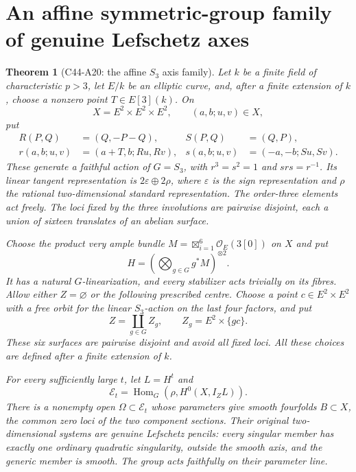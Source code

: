\documentclass[11pt]{article}
\newtheorem{theorem}{Theorem}[section]
\theoremstyle{remark}\newtheorem{remark}[theorem]{Remark}
\begin{document}
\section{An affine symmetric-group family of genuine Lefschetz axes}
\label{sec:c44-a20}

\begin{theorem}[C44-A20: the affine $S_3$ axis family]
Let $k$ be a finite field of characteristic $p>3$, let $E/k$
be an elliptic curve, and, after a finite extension of $k$,
choose a nonzero point $T\in E[3](k)$. On
\[
       X=E^2\times E^2\times E^2,
       \qquad(a,b;u,v)\in X,
\]
put
\[
 \begin{aligned}
 R(P,Q)&=(Q,-P-Q),& S(P,Q)&=(Q,P),\\
 r(a,b;u,v)&=(a+T,b;Ru,Rv),&
 s(a,b;u,v)&=(-a,-b;Su,Sv).
 \end{aligned}                                                   \tag{A20.1}
\]
These generate a faithful action of $G=S_3$, with
$r^3=s^2=1$ and $srs=r^{-1}$. Its linear tangent
representation is $2\varepsilon\oplus2\rho$, where
$\varepsilon$ is the sign representation and $\rho$
the rational two-dimensional standard representation.
The order-three elements act freely. The loci fixed by
the three involutions are pairwise disjoint, each a
union of sixteen translates of an abelian surface.

Choose the product very ample bundle
$M=\boxtimes_{i=1}^6\mathcal O_E(3[0])$ on $X$ and put
\[
               H=\left(\bigotimes_{g\in G}g^*M\right)^{\otimes2}.
 \tag{A20.2}
\]
It has a natural $G$-linearization, and every stabilizer
acts trivially on its fibres. Allow either $Z=\varnothing$
or the following prescribed centre. Choose a point
$c\in E^2\times E^2$ with a free orbit for the linear
$S_3$-action on the last four factors, and put
\[
                  Z=\coprod_{g\in G}Z_g,
             \qquad Z_g=E^2\times\{gc\}.
 \tag{A20.3}
\]
These six surfaces are pairwise disjoint and avoid all
fixed loci. All these choices are defined after a finite
extension of $k$.

For every sufficiently large $t$, let $L=H^t$ and
\[
        \mathcal E_t=\operatorname{Hom}_G
                  (\rho,H^0(X,I_ZL)).
 \tag{A20.4}
\]
There is a nonempty open $\Omega\subset\mathcal E_t$
whose parameters give smooth fourfolds $B\subset X$,
the common zero loci of the two component sections.
Their original two-dimensional systems are genuine
Lefschetz pencils: every singular member has exactly
one ordinary quadratic singularity, outside the smooth
axis, and the generic member is smooth.
The group acts faithfully on their parameter line.


\end{theorem}
\end{document}
